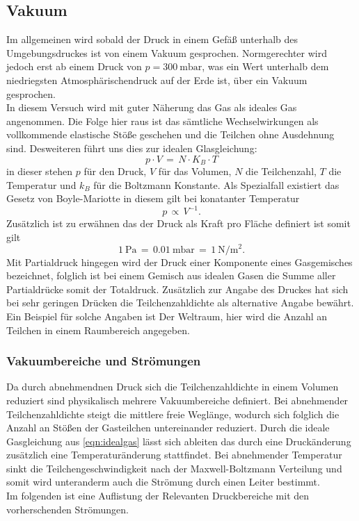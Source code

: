 \subsection{Vakuum}
\label{sec:vakuumtheo}

Im allgemeinen wird sobald der Druck in einem Gefäß unterhalb des Umgebungsdruckes ist von einem Vakuum gesprochen. Normgerechter 
wird jedoch erst ab einem Druck von $p=\SI{300}{\milli\bar}$, was ein Wert unterhalb dem niedriegsten Atmosphärischendruck auf der 
Erde ist, über ein Vakuum gesprochen.\\
In diesem Versuch wird mit guter Näherung das Gas als ideales Gas angenommen. Die Folge hier raus ist das sämtliche Wechselwirkungen 
als vollkommende elastische Stöße geschehen und die Teilchen ohne Ausdehnung sind. Desweiteren führt uns dies zur idealen Glasgleichung:
\begin {equation}
 p\cdot V\,=\, N\cdot K_B\cdot T
\label{eqn:idealgas}
\end{equation}
in dieser stehen $p$ für den Druck, $V$ für das Volumen, $N$ die Teilchenzahl, $T$ die Temperatur und $k_B$ für die Boltzmann Konstante. 
Als Spezialfall existiert das Gesetz von Boyle-Mariotte in diesem gilt bei konatanter Temperatur 
\begin {equation*}
 p\,\propto \, V^{-1}.
\end{equation*}
Zusätzlich ist zu erwähnen das der Druck als Kraft pro Fläche definiert ist somit gilt
\begin {equation*}
 \SI{1}{\pascal}\,=\,\SI{0.01}{\milli\bar}\,=\,\SI{1}{\newton\per\metre\squared}.
\end{equation*}
Mit Partialdruck hingegen wird der Druck einer Komponente eines Gasgemisches bezeichnet, folglich ist bei einem Gemisch aus 
idealen Gasen die Summe aller Partialdrücke somit der Totaldruck. Zusätzlich zur Angabe des Druckes hat sich bei sehr geringen 
Drücken die Teilchenzahldichte als alternative Angabe bewährt. Ein Beispiel für solche Angaben ist Der Weltraum, hier wird die 
Anzahl an Teilchen in einem Raumbereich angegeben.
\subsubsection{Vakuumbereiche und Strömungen}
Da durch abnehmendnen Druck sich die Teilchenzahldichte in einem Volumen reduziert sind physikalisch mehrere Vakuumbereiche 
definiert. Bei abnehmender Teilchenzahldichte steigt die mittlere freie Weglänge, wodurch sich folglich die Anzahl an Stößen der 
Gasteilchen untereinander reduziert. Durch die ideale Gasgleichung aus \autoref{eqn:idealgas} lässt sich ableiten das durch eine 
Druckänderung zusätzlich eine Temperaturänderung stattfindet. Bei abnehmender Temperatur sinkt die Teilchengeschwindigkeit nach der 
Maxwell-Boltzmann Verteilung und somit wird unteranderm auch die Strömung durch einen Leiter bestimmt.\\
Im folgenden ist eine Auflistung der Relevanten Druckbereiche mit den vorherschenden Strömungen.


